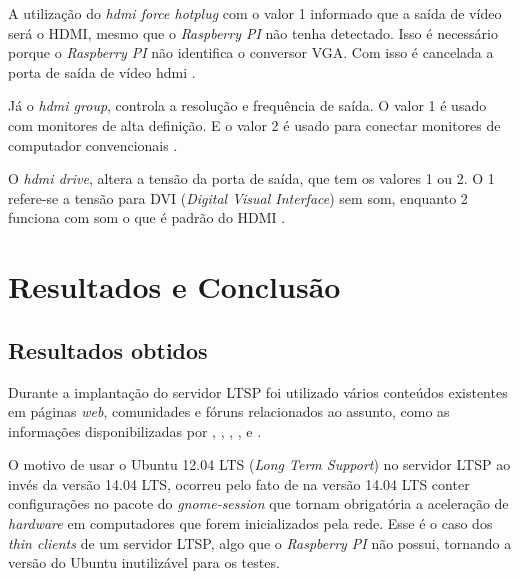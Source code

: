 \documentclass[
	12pt,				%
	openright,			%
	twoside,			%
	a4paper,			%
	chapter=TITLE,		%
	english,			%
	brazil				%
	]{abntex2}
\begin{document}
A utilização do \textit{hdmi force hotplug} com o valor 1 informado que a saída de vídeo será o HDMI, mesmo que o \textit{Raspberry PI} não tenha detectado. Isso é necessário porque o \textit{Raspberry PI} não identifica o conversor VGA. Com isso é cancelada a porta de saída de vídeo hdmi \cite{vga}.  

Já o \textit{hdmi group}, controla a resolução e frequência de saída. O valor 1 é usado com monitores de alta definição. E o valor 2 é usado para  conectar monitores de computador convencionais \cite{vga}. 

O \textit{hdmi drive}, altera a tensão da porta de saída, que tem os valores 1 ou 2. O 1 refere-se a tensão para DVI (\textit{Digital Visual Interface}) sem som, enquanto 2 funciona com som o que é padrão do HDMI \cite{vga}. 






\chapter{Resultados e Conclusão}

\section{Resultados obtidos}
\label{result}

Durante a implantação do servidor LTSP foi utilizado vários conteúdos existentes em páginas \textit{web}, comunidades e fóruns relacionados ao assunto, como as informações disponibilizadas por , , , ,  e .

O motivo de usar o Ubuntu 12.04 LTS (\textit{Long Term Support}) no servidor LTSP ao invés da versão 14.04 LTS, ocorreu pelo fato de na versão 14.04 LTS conter configurações no pacote do \textit{gnome-session} que tornam obrigatória a aceleração de \textit{hardware} em computadores que forem inicializados pela rede. Esse é o caso dos \textit{thin clients} de um servidor LTSP, algo que o \textit{Raspberry PI} não possui, tornando a versão do Ubuntu inutilizável para os testes.
\end{document}
